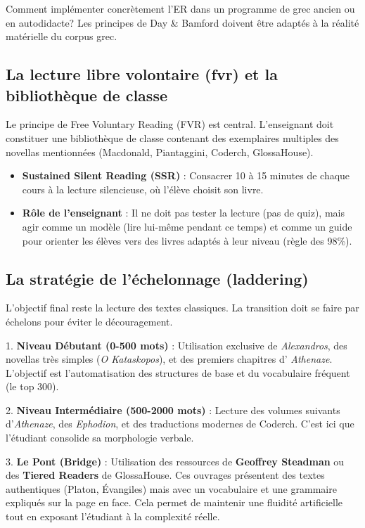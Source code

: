 Comment implémenter concrètement l'ER dans un programme de grec ancien ou en autodidacte? Les
principes de Day \& Bamford doivent être adaptés à la réalité matérielle du corpus grec.



\subsection{La lecture libre volontaire (fvr) et la bibliothèque de classe}

Le principe de \og Free Voluntary Reading\fg{} (FVR) est central. L'enseignant doit constituer une
bibliothèque de classe contenant des exemplaires multiples des novellas mentionnées (Macdonald,
Piantaggini, Coderch, GlossaHouse).\cite{III-3-2-ref52}

\begin{itemize}\item \textbf{Sustained Silent Reading (SSR)} : Consacrer 10 à 15 minutes de chaque cours à la lecture silencieuse, où l'élève choisit son livre.\item \textbf{Rôle de l'enseignant} : Il ne doit pas tester la lecture (pas de quiz), mais agir comme un modèle (lire lui-même pendant ce temps) et comme un guide pour orienter les élèves vers des livres adaptés à leur niveau (règle des 98\%).\cite{III-3-2-ref44}\end{itemize}

\subsection{La stratégie de l'échelonnage (laddering)}

L'objectif final reste la lecture des textes classiques. La transition doit se faire par \og
échelons\fg{} pour éviter le découragement.

1. \textbf{Niveau Débutant (0-500 mots)} : Utilisation exclusive de \textit{Alexandros}, des
novellas très simples (\textit{O Kataskopos}), et des premiers chapitres d' \textit{Athenaze}.
L'objectif est l'automatisation des structures de base et du vocabulaire fréquent (le \og top
300\fg{}).

2. \textbf{Niveau Intermédiaire (500-2000 mots)} : Lecture des volumes suivants d'\textit{Athenaze},
des \textit{Ephodion}, et des traductions modernes de Coderch. C'est ici que l'étudiant consolide sa
morphologie verbale.

3. \textbf{Le Pont (Bridge)} : Utilisation des ressources de \textbf{Geoffrey Steadman} ou des
\textbf{Tiered Readers} de GlossaHouse. Ces ouvrages présentent des textes authentiques (Platon,
Évangiles) mais avec un vocabulaire et une grammaire expliqués sur la page en face. Cela permet de
maintenir une fluidité artificielle tout en exposant l'étudiant à la complexité
réelle.\cite{III-3-2-ref28}

